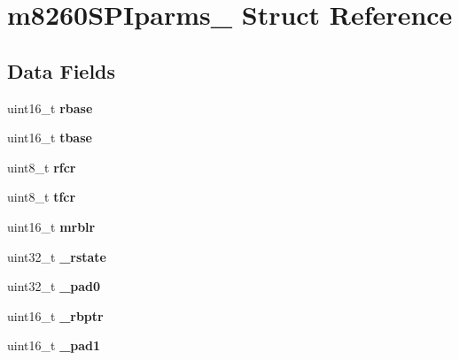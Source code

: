\hypertarget{structm8260SPIparms__}{}\section{m8260\+S\+P\+Iparms\+\_\+ Struct Reference}
\label{structm8260SPIparms__}
\subsection*{Data Fields}
\begin{DoxyCompactItemize}
\item 
\mbox{\label{structm8260SPIparms___a7aacb960678433b444b7e7663c23fb43}} 
uint16\+\_\+t {\bfseries rbase}
\item 
\mbox{\label{structm8260SPIparms___a35344fc8527c1b7e3dbd2b7139441fba}} 
uint16\+\_\+t {\bfseries tbase}
\item 
\mbox{\label{structm8260SPIparms___a3e9540818997c87720d3e53077fc6c19}} 
uint8\+\_\+t {\bfseries rfcr}
\item 
\mbox{\label{structm8260SPIparms___af6d088b739346f156eeaa4e8a08ce084}} 
uint8\+\_\+t {\bfseries tfcr}
\item 
\mbox{\label{structm8260SPIparms___a56ff4d80e5adf2bafddff4c6b6223d8b}} 
uint16\+\_\+t {\bfseries mrblr}
\item 
\mbox{\label{structm8260SPIparms___a5262fc12d1a13b74c64052486ea08d63}} 
uint32\+\_\+t {\bfseries \+\_\+rstate}
\item 
\mbox{\label{structm8260SPIparms___a12783a2f5d5e4efd8d046d910dc8b655}} 
uint32\+\_\+t {\bfseries \+\_\+pad0}
\item 
\mbox{\label{structm8260SPIparms___a61b2253ece9aea6cd616e86b09997144}} 
uint16\+\_\+t {\bfseries \+\_\+rbptr}
\item 
\mbox{\label{structm8260SPIparms___abcaccde52ae11870d41272743fdea6f8}} 
uint16\+\_\+t {\bfseries \+\_\+pad1}
\item 

\end{DoxyCompactItemize}

